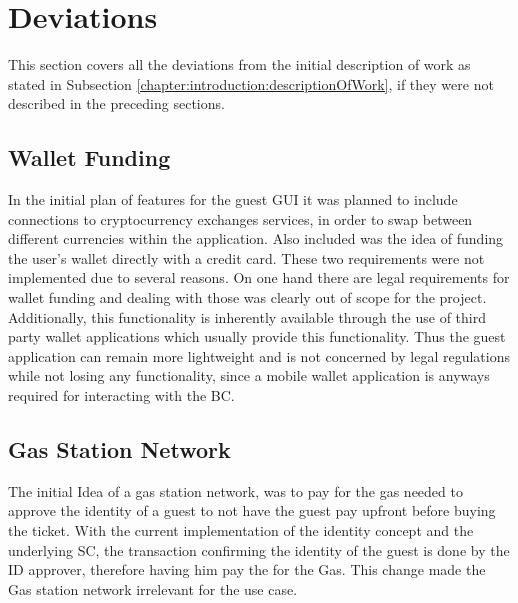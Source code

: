 \section{Deviations}
This section covers all the deviations from the initial description of work as stated in Subsection \ref{chapter:introduction:descriptionOfWork}, if they were not described in the preceding sections.

\subsection{Wallet Funding}
In the initial plan of features for the guest GUI it was planned to include connections to cryptocurrency exchanges services, in order to swap between different currencies within the application. Also included was the idea of funding the user's wallet directly with a credit card. These two requirements were not implemented due to several reasons. On one hand there are legal requirements for wallet funding and dealing with those was clearly out of scope for the project. Additionally, this functionality is inherently available through the use of third party wallet applications which usually provide this functionality. Thus the guest application can remain more lightweight and is not concerned by legal regulations while not losing any functionality, since a mobile wallet application is anyways required for interacting with the BC.

\subsection{Gas Station Network}
The initial Idea of a gas station network, was to pay for the gas needed to approve the identity of a guest to not have the guest pay upfront before buying the ticket. With the current implementation of the identity concept and the underlying SC, the transaction confirming the identity of the guest is done by the ID approver, therefore having him pay the for the Gas. This change made the Gas station network irrelevant for the use case.
